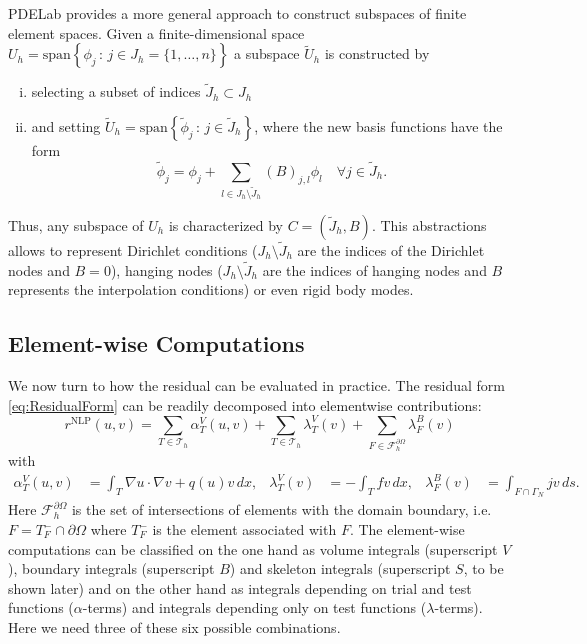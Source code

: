 \documentclass[a4paper,12pt]{article}
\begin{document}
PDELab provides a more general approach to construct subspaces of
finite element spaces. Given a
finite-dimensional space $U_h = \text{span}\left\{\phi_j \,:\, j\in J_h=\{1,\ldots,n\}\right\}$
a subspace $\tilde{U}_h$ is constructed by 
\begin{enumerate}[i)]
\item selecting a subset of indices $\tilde{J}_h\subset J_h$
\item and setting $\tilde{U}_h = \text{span}\left\{\tilde\phi_j \,:\, j\in \tilde{J}_h\right\}$,
where the new basis functions have the form 
\begin{equation*}
\tilde\phi_j = \phi_j + \sum_{l\in J_h\setminus\tilde{J}_h} (B)_{j,l} \phi_l \quad \forall j\in \tilde{J}_h.
\end{equation*}
\end{enumerate}
Thus, any subspace of $U_h$ is characterized by $C=(\tilde{J}_h,B)$.
This abstractions allows to represent Dirichlet conditions ($J_h\setminus\tilde{J}_h$
are the indices of the Dirichlet nodes and $B=0$), hanging nodes
($J_h\setminus\tilde{J}_h$ are the indices of hanging nodes and $B$ represents
the interpolation conditions) or even rigid body modes.


\subsection{Element-wise Computations}
\label{Sec:ElementComputations}

We now turn to how the residual can be evaluated in practice.
The residual form \eqref{eq:ResidualForm} can be readily decomposed into
elementwise contributions:
\begin{equation*}
r^{\text{NLP}}\left(u,v\right) =  
\sum_{T\in\mathcal{T}_h} \alpha_T^V(u,v) 
  + \sum_{T\in\mathcal{T}_h} \lambda_T^V(v)
 + \sum_{F\in\mathcal{F}_h^{\partial\Omega}}\lambda_F^B(v)
\end{equation*}
with
\begin{align*}
\alpha_T^V(u,v) &= \int_T \nabla u \cdot \nabla v + q(u) v \,dx, &
\lambda_T^V(v) &= - \int_T f v \,dx, &
\lambda_F^B(v) &= \int_{F\cap\Gamma_N} j v\,ds.
\end{align*}
Here $\mathcal{F}_h^{\partial\Omega}$ is the set of intersections of
elements with the domain boundary, i.e. $F=T_F^-\cap\partial\Omega$
where $T_F^-$ is the element associated with $F$. 
The element-wise computations can be classified on the one hand as volume
integrals (superscript $V$), boundary integrals (superscript $B$) and
skeleton integrals (superscript $S$, to be shown later) and on the
other hand as integrals depending on trial and test functions ($\alpha$-terms)
and integrals depending only on test functions ($\lambda$-terms). Here we need
three of these six possible combinations.
\end{document}
